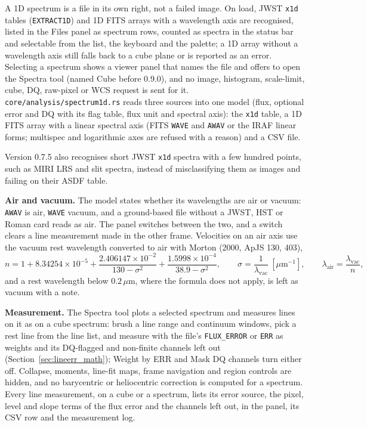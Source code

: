 \documentclass[11pt,a4paper]{article}
\newcommand{\code}[1]{\texttt{\small #1}}
\begin{document}
    A 1D spectrum is a file in its own right, not a failed image. On load, JWST \code{x1d} tables (\code{EXTRACT1D}) and 1D FITS arrays with a wavelength axis are recognised, listed in the Files panel as spectrum rows, counted as spectra in the status bar and selectable from the list, the keyboard and the palette; a 1D array without a wavelength axis still falls back to a cube plane or is reported as an error. Selecting a spectrum shows a viewer panel that names the file and offers to open the Spectra tool (named Cube before 0.9.0), and no image, histogram, scale-limit, cube, DQ, raw-pixel or WCS request is sent for it. \code{core/analysis/spectrum1d.rs} reads three sources into one model (flux, optional error and DQ with its flag table, flux unit and spectral axis): the \code{x1d} table, a 1D FITS array with a linear spectral axis (FITS \code{WAVE} and \code{AWAV} or the IRAF linear forms; multispec and logarithmic axes are refused with a reason) and a CSV file.

    Version 0.7.5 also recognises short JWST \code{x1d} spectra with a few hundred points, such as MIRI LRS and slit spectra, instead of misclassifying them as images and failing on their ASDF table.

    \textbf{Air and vacuum.} The model states whether its wavelengths are air or vacuum: \code{AWAV} is air, \code{WAVE} vacuum, and a ground-based file without a JWST, HST or Roman card reads as air. The panel switches between the two, and a switch clears a line measurement made in the other frame. Velocities on an air axis use the vacuum rest wavelength converted to air with Morton (2000, ApJS 130, 403),
    \begin{equation}
        n = 1 + 8.34254 \times 10^{-5} + \frac{2.406147 \times 10^{-2}}{130 - \sigma^2} + \frac{1.5998 \times 10^{-4}}{38.9 - \sigma^2},
        \qquad \sigma = \frac{1}{\lambda_{\text{vac}}}\ [\mu\text{m}^{-1}], \qquad
        \lambda_{\text{air}} = \frac{\lambda_{\text{vac}}}{n},
    \end{equation}
    and a rest wavelength below $0.2\,\mu$m, where the formula does not apply, is left as vacuum with a note.

    \textbf{Measurement.} The Spectra tool plots a selected spectrum and measures lines on it as on a cube spectrum: brush a line range and continuum windows, pick a rest line from the line list, and measure with the file's \code{FLUX\_ERROR} or \code{ERR} as weights and its DQ-flagged and non-finite channels left out (Section~\ref{sec:lineerr_math}); Weight by ERR and Mask DQ channels turn either off. Collapse, moments, line-fit maps, frame navigation and region controls are hidden, and no barycentric or heliocentric correction is computed for a spectrum. Every line measurement, on a cube or a spectrum, lists its error source, the pixel, level and slope terms of the flux error and the channels left out, in the panel, its CSV row and the measurement log.
\end{document}
